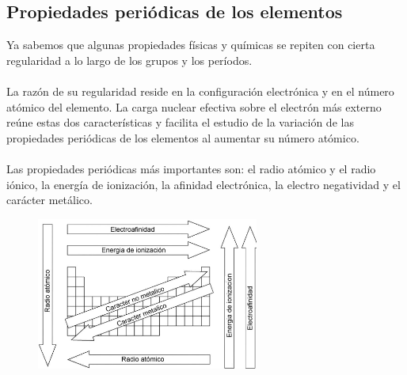 \documentclass[12pt]{article}
\begin{document}
                    \begin{table}[H]
                         \centering
                         \begin{adjustbox}{max width=\textwidth}
                         \end{adjustbox}
                         \label{tab:2}
                    \end{table}

               \subsection{Propiedades periódicas de los elementos}\label{sec:Propiedades periódicas de los elementos}
                    Ya sabemos que algunas propiedades físicas y químicas se repiten con cierta regularidad a lo largo de los grupos y los períodos.\\\\
                    La razón de su regularidad reside en la configuración electrónica y en el número atómico del elemento. La carga nuclear efectiva sobre el electrón más externo reúne estas dos características y facilita el estudio de la variación de las propiedades periódicas de los elementos al aumentar su número atómico.\\\\
                    Las propiedades periódicas más importantes son: el radio atómico y el radio iónico, la energía de ionización, la afinidad electrónica, la electro negatividad y el carácter metálico.

                    \begin{figure}[H]
                         \centering
                         \includegraphics[height=5cm]{Propiedades_Periodicas.png}
                         \label{Fig:One-hot_endcoding_AF01}
                    \end{figure}
               
\end{document}
